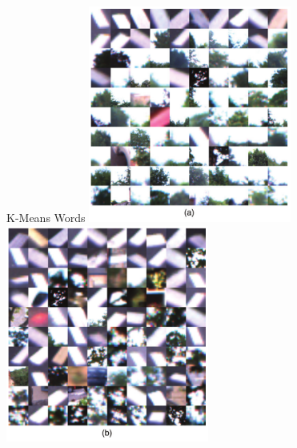 \begin{frame}{K-Means Words}
    \includegraphics[width=0.5\textwidth]{./media/words_fabmap2a.png}
    \includegraphics[width=0.5\textwidth]{./media/words_fabmap2b.png}
\end{frame}

